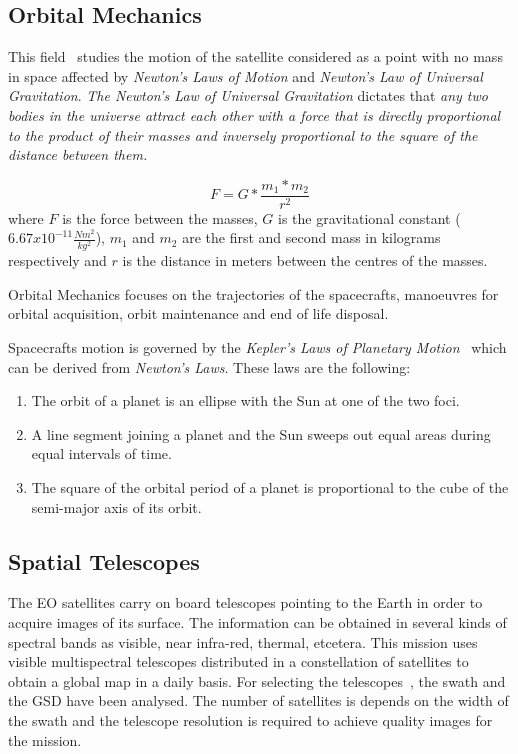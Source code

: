 \subsection{Orbital Mechanics}

This field~\cite{Braeunig2013} studies the motion of the satellite considered as a point with no
mass in space affected by \emph{Newton's Laws of Motion} and \emph{Newton's Law of
Universal Gravitation}.
\emph{The Newton's Law of Universal Gravitation} dictates that \emph{any two bodies in the
universe attract each other with a force that is directly proportional to the
product of their masses and inversely proportional to the square of the distance
between them.}

\begin{equation}
F = G* {\frac {m_1*m_2}{r^2}}
\end{equation}
where $F$ is the force between the masses, $G$ is the gravitational constant
($6.67x10^{-11} \frac{Nm^2}{kg^2}$), $m_1$ and $m_2$ are the first and second
mass in kilograms respectively
and $r$ is the distance in meters between the centres of the masses.

Orbital Mechanics focuses on the trajectories of the
spacecrafts, manoeuvres for orbital acquisition, orbit maintenance and end of life
disposal.

Spacecrafts motion  is governed by the \emph{Kepler's Laws of Planetary
  Motion}~\cite{Stern2014} which can be derived from \emph{Newton's Laws}. These laws are the following:
\begin{enumerate}
\item The orbit of a planet is an ellipse with the Sun at one of the two foci.
\item A line segment joining a planet and the Sun sweeps out equal areas during
  equal intervals of time.
\item The square of the orbital period of a planet is proportional to the cube
  of the semi-major axis of its orbit.
\end{enumerate}


\subsection{Spatial Telescopes }

The \ac{EO} satellites carry on board telescopes pointing to the Earth in order
to acquire images of its surface. The information can be obtained in several
kinds of spectral bands as visible, near infra-red, thermal, etcetera. This
mission uses visible multispectral telescopes distributed in a constellation of satellites
to obtain a global map in a daily basis. For selecting the telescopes~\cite{Ball2013}, the swath
and the \ac{GSD}
have been analysed. The number of satellites is depends on the width of the
swath and the telescope resolution is required to achieve quality
images for the mission.

